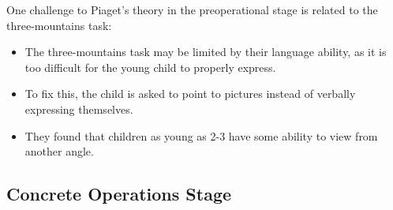 \documentclass[../main/main.tex]{subfiles}
\begin{document}
One challenge to Piaget's theory in the preoperational stage is related to the three-mountains task:
\begin{itemize}
  \item The three-mountains task may be limited by their language ability, as it is too difficult for the young child to properly express.
  \item To fix this, the child is asked to point to pictures instead of verbally expressing themselves.
        \item They found that children as young as 2-3 have some ability to view from another angle.
\end{itemize}

\subsection{Concrete Operations Stage}
\end{document}

